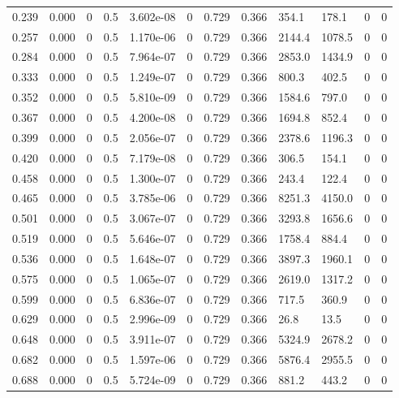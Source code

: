 \documentclass[preview]{standalone}
\begin{document}
{{\begin{tabular}{L{1.2cm}C{1.2cm} C{0.3cm}C{0.5cm} C{1.4cm}C{1.4cm} C{1.4cm}C{1.4cm} C{1.6cm}C{1.6cm} C{1.6cm}C{1.6cm}}
  0.239  &  0.000  & 0     & 0.5 &  3.602e-08  & 0  &  0.729&   0.366& 354.1 & 178.1   &  0 & 0  \\ 
  0.257  &  0.000  & 0     & 0.5 &  1.170e-06  & 0  &  0.729&   0.366& 2144.4 & 1078.5   &  0 & 0  \\ 
  0.284  &  0.000  & 0     & 0.5 &  7.964e-07  & 0  &  0.729&   0.366& 2853.0 & 1434.9   &  0 & 0  \\ 
  0.333  &  0.000  & 0     & 0.5 &  1.249e-07  & 0  &  0.729&   0.366& 800.3 & 402.5   &  0 & 0  \\ 
  0.352  &  0.000  & 0     & 0.5 &  5.810e-09  & 0  &  0.729&   0.366& 1584.6 & 797.0   &  0 & 0  \\ 
  0.367  &  0.000  & 0     & 0.5 &  4.200e-08  & 0  &  0.729&   0.366& 1694.8 & 852.4   &  0 & 0  \\ 
  0.399  &  0.000  & 0     & 0.5 &  2.056e-07  & 0  &  0.729&   0.366& 2378.6 & 1196.3   &  0 & 0  \\ 
  0.420  &  0.000  & 0     & 0.5 &  7.179e-08  & 0  &  0.729&   0.366& 306.5 & 154.1   &  0 & 0  \\ 
  0.458  &  0.000  & 0     & 0.5 &  1.300e-07  & 0  &  0.729&   0.366& 243.4 & 122.4   &  0 & 0  \\ 
  0.465  &  0.000  & 0     & 0.5 &  3.785e-06  & 0  &  0.729&   0.366& 8251.3 & 4150.0   &  0 & 0  \\ 
  0.501  &  0.000  & 0     & 0.5 &  3.067e-07  & 0  &  0.729&   0.366& 3293.8 & 1656.6   &  0 & 0  \\ 
  0.519  &  0.000  & 0     & 0.5 &  5.646e-07  & 0  &  0.729&   0.366& 1758.4 & 884.4   &  0 & 0  \\ 
  0.536  &  0.000  & 0     & 0.5 &  1.648e-07  & 0  &  0.729&   0.366& 3897.3 & 1960.1   &  0 & 0  \\ 
  0.575  &  0.000  & 0     & 0.5 &  1.065e-07  & 0  &  0.729&   0.366& 2619.0 & 1317.2   &  0 & 0  \\ 
  0.599  &  0.000  & 0     & 0.5 &  6.836e-07  & 0  &  0.729&   0.366& 717.5 & 360.9   &  0 & 0  \\ 
  0.629  &  0.000  & 0     & 0.5 &  2.996e-09  & 0  &  0.729&   0.366& 26.8 & 13.5   &  0 & 0  \\ 
  0.648  &  0.000  & 0     & 0.5 &  3.911e-07  & 0  &  0.729&   0.366& 5324.9 & 2678.2   &  0 & 0  \\ 
  0.682  &  0.000  & 0     & 0.5 &  1.597e-06  & 0  &  0.729&   0.366& 5876.4 & 2955.5   &  0 & 0  \\ 
  0.688  &  0.000  & 0     & 0.5 &  5.724e-09  & 0  &  0.729&   0.366& 881.2 & 443.2   &  0 & 0  \\ 

\end{tabular}}}
\end{document}
